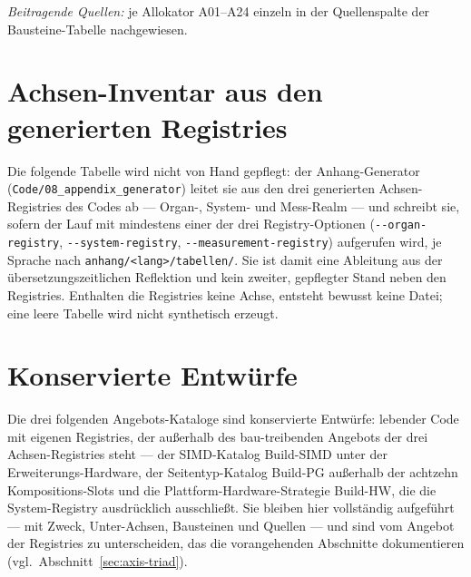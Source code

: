 \begin{scriptsize}
\begin{longtable}{@{}>{\raggedright\arraybackslash}p{3.0cm} >{\raggedright\arraybackslash}p{6.0cm} >{\raggedright\arraybackslash}p{4.5cm}@{}}
\bottomrule
\end{longtable}
\end{scriptsize}

\emph{Beitragende Quellen:} je Allokator A01--A24 einzeln in der Quellenspalte der Bausteine-Tabelle nachgewiesen.

\setlength{\tabcolsep}{6pt}

\section{Achsen-Inventar aus den generierten Registries}

Die folgende Tabelle wird nicht von Hand gepflegt: der Anhang-Generator
(\texttt{Code/\allowbreak{}08\_\allowbreak{}appendix\_\allowbreak{}generator}) leitet sie aus den drei generierten Achsen-Registries des
Codes ab --- Organ-, System- und Mess-Realm --- und schreibt sie, sofern der Lauf mit mindestens einer der drei
Registry-Optionen (\texttt{-{}-organ-registry}, \texttt{-{}-system-registry}, \texttt{-{}-measurement-registry})
aufgerufen wird, je Sprache nach \texttt{anhang/<lang>/tabellen/}. Sie ist damit eine Ableitung aus der
übersetzungszeitlichen Reflektion und kein zweiter, gepflegter Stand neben den Registries. Enthalten die
Registries keine Achse, entsteht bewusst keine Datei; eine leere Tabelle wird nicht synthetisch
erzeugt.


\section{Konservierte Entwürfe}\label{sec:app-blocks-konserviert}
Die drei folgenden Angebots-Kataloge sind konservierte Entwürfe: lebender Code mit eigenen Registries, der
außerhalb des bau-treibenden Angebots der drei Achsen-Registries steht --- der SIMD-Katalog Build-SIMD unter der
Erweiterungs-Hardware, der Seitentyp-Katalog Build-PG außerhalb der achtzehn Kompositions-Slots und die
Plattform-Hardware-Strategie Build-HW, die die System-Registry ausdrücklich ausschließt. Sie bleiben hier
vollständig aufgeführt --- mit Zweck, Unter-Achsen, Bausteinen und Quellen --- und sind vom Angebot der
Registries zu unterscheiden, das die vorangehenden Abschnitte dokumentieren (vgl.\ Abschnitt~\ref{sec:axis-triad}).

